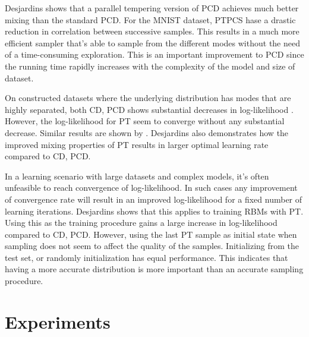 \documentclass[12pt]{article}
\begin{document}
Desjardins \cite{desjardins2010tempered} shows that a parallel tempering version of PCD achieves much better mixing than the standard PCD. For the MNIST dataset, PTPCS hase a drastic reduction in correlation between successive samples. This results in a much more efficient sampler that's able to sample from the different modes without the need of a time-consuming exploration. This is an important improvement to PCD since the running time rapidly increases with the complexity of the model and size of dataset.

On constructed datasets where the underlying distribution has modes that are highly separated, both CD, PCD shows substantial decreases in log-likelihood \cite{desjardins2010tempered}. However, the log-likelihood for PT seem to converge without any substantial decrease. Similar results are shown by \cite{salakhutdinov2009tempered}. Desjardins also demonstrates how the improved mixing properties of PT results in larger optimal learning rate compared to CD, PCD.

In a learning scenario with large datasets and complex models, it's often unfeasible to reach convergence of log-likelihood. In such cases any improvement of convergence rate will result in an improved log-likelihood for a fixed number of learning iterations. Desjardins \cite{desjardins2010tempered} shows that this applies to training RBMs with PT. Using this as the training procedure gains a large increase in log-likelihood compared to CD, PCD. However, using the last PT sample as initial state when sampling does not seem to affect the quality of the samples. Initializing from the test set, or randomly initialization has equal performance. This indicates that having a more accurate distribution is more important than an accurate sampling procedure.

\section{Experiments}

 

\end{document}
